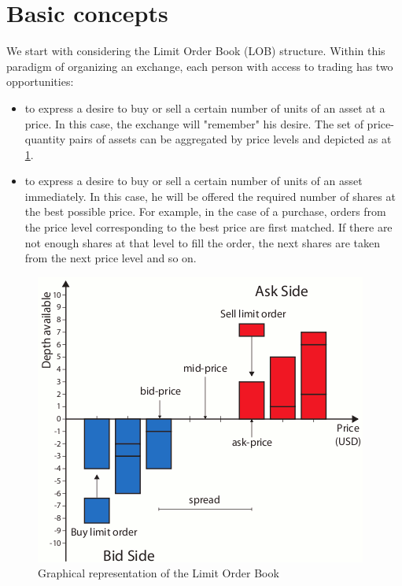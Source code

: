 
\section{Basic concepts}
We start with considering the Limit Order Book (LOB) structure. Within this paradigm of organizing an exchange, 
each person with access to trading has two opportunities: 
\begin{itemize}
    \item to express a desire to buy or sell a certain number of units of an asset at a price. In this case, the 
    exchange will "remember" his desire. The set of price-quantity pairs of assets can be aggregated by price levels and 
    depicted as at \ref{LOBpic}.
    \item to express a desire to buy or sell a certain number of units of an asset immediately. In this case, he will 
    be offered the required number of shares at the best possible price. For example, in the case of a purchase, 
    orders from the price level corresponding to the best price are first matched. If there are not enough shares 
    at that level to fill the order, the next shares are taken from the next price level and so on.
    
\end{itemize}

\begin{figure}
    \includegraphics[scale=0.8]{fig/Graphical-representation-of-the-Limit-Order-Book.png}
    \caption{Graphical representation of the Limit Order Book}
    \label{LOBpic}
\end{figure}



